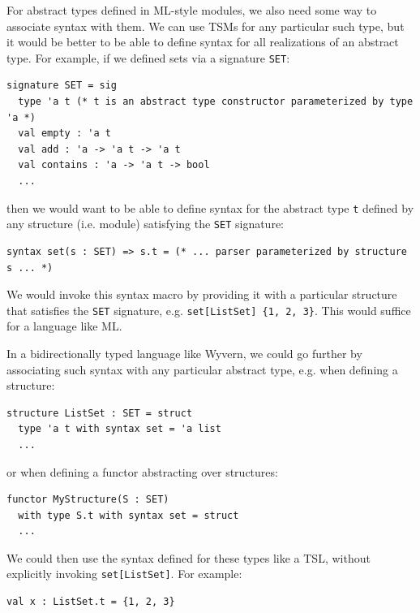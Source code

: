 \begin{contribution} \label{cont:abstype-syntax}
For abstract types defined in ML-style modules, we also need some way to associate syntax with them. We can use TSMs for any particular such type, but it would be better to be able to define syntax for all realizations of an abstract type. For example, if we defined sets via a signature \lstinline{SET}:

\begin{lstlisting}[numbers=none]
signature SET = sig
  type 'a t (* t is an abstract type constructor parameterized by type 'a *)
  val empty : 'a t
  val add : 'a -> 'a t -> 'a t
  val contains : 'a -> 'a t -> bool
  ...
\end{lstlisting}
then we would want to be able to define syntax for the abstract type \verb|t| defined by any structure (i.e. module) satisfying the \lstinline{SET} signature:
\begin{lstlisting}[numbers=none]
syntax set(s : SET) => s.t = (* ... parser parameterized by structure s ... *)
\end{lstlisting}

We would invoke this syntax macro by providing it with a particular structure that satisfies the \verb|SET| signature, e.g. \verb|set[ListSet] {1, 2, 3}|. This would suffice for a language like ML.%

In a bidirectionally typed language like Wyvern, we could go further by associating such syntax with any particular abstract type, e.g. when defining a structure:

\begin{lstlisting}[numbers=none]
structure ListSet : SET = struct 
  type 'a t with syntax set = 'a list
  ...
\end{lstlisting}
or when defining a functor abstracting over structures:
\begin{lstlisting}[numbers=none]
functor MyStructure(S : SET) 
  with type S.t with syntax set = struct
  ...
\end{lstlisting}
We could then use the syntax defined for these types like a TSL, without explicitly invoking \lstinline{set[ListSet]}. For example:

\begin{lstlisting}[numbers=none]
val x : ListSet.t = {1, 2, 3}
\end{lstlisting}
\end{contribution}



